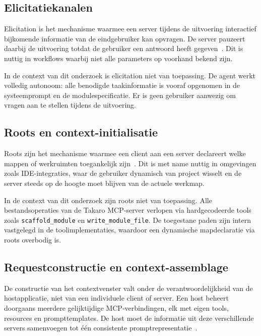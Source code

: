 \subsection{Elicitatiekanalen}\label{subsec:mcp-elicitation}

Elicitation is het mechanisme waarmee een server tijdens de uitvoering interactief bijkomende informatie van de eindgebruiker kan opvragen. De server pauzeert daarbij de uitvoering totdat de gebruiker een antwoord heeft gegeven~\cite{mcpspec2025elicitation}. Dit is nuttig in workflows waarbij niet alle parameters op voorhand bekend zijn.

In de context van dit onderzoek is elicitation niet van toepassing. De agent werkt volledig autonoom: alle benodigde taakinformatie is vooraf opgenomen in de systeemprompt en de modulespecificatie. Er is geen gebruiker aanwezig om vragen aan te stellen tijdens de uitvoering.

\subsection{Roots en context-initialisatie}\label{subsec:mcp-roots}

Roots zijn het mechanisme waarmee een client aan een server declareert welke mappen of werkruimten toegankelijk zijn~\cite{mcpspec2025roots}. Dit is met name nuttig in omgevingen zoals IDE-integraties, waar de gebruiker dynamisch van project wisselt en de server steeds op de hoogte moet blijven van de actuele werkmap.

In de context van dit onderzoek zijn roots niet van toepassing. Alle bestandsoperaties van de Takaro MCP-server verlopen via hardgecodeerde tools zoals \texttt{scaffold\_module} en \texttt{write\_module\_file}. De toegestane paden zijn intern vastgelegd in de toolimplementaties, waardoor een dynamische mapdeclaratie via roots overbodig is.

\subsection{Requestconstructie en context-assemblage}\label{subsec:mcp-context-assembly}

De constructie van het contextvenster valt onder de verantwoordelijkheid van de hostapplicatie, niet van een individuele client of server. Een host beheert doorgaans meerdere gelijktijdige MCP-verbindingen, elk met eigen tools, resources en prompttemplates. De host moet de informatie uit deze verschillende servers samenvoegen tot één consistente promptrepresentatie~\cite{mcpspec2025architecture}.

